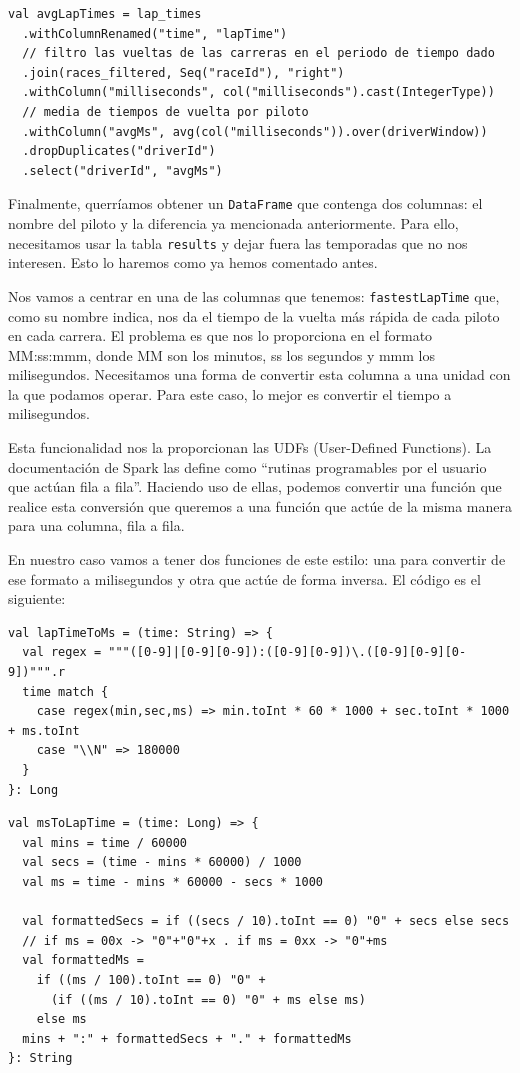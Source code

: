 \documentclass[12pt,twoside,titlepage]{report}
\newcommand{\quotes}[1]{``#1''}
\begin{document}
\begin{lstlisting}
val avgLapTimes = lap_times
  .withColumnRenamed("time", "lapTime")
  // filtro las vueltas de las carreras en el periodo de tiempo dado
  .join(races_filtered, Seq("raceId"), "right")
  .withColumn("milliseconds", col("milliseconds").cast(IntegerType))
  // media de tiempos de vuelta por piloto
  .withColumn("avgMs", avg(col("milliseconds")).over(driverWindow))
  .dropDuplicates("driverId")
  .select("driverId", "avgMs")
\end{lstlisting}


Finalmente, querríamos obtener un \texttt{DataFrame} que contenga dos columnas: el nombre del piloto y la diferencia ya mencionada anteriormente. Para ello, necesitamos usar la tabla \texttt{results} y dejar fuera las temporadas que no nos interesen. Esto lo haremos como ya hemos comentado antes.

Nos vamos a centrar en una de las columnas que tenemos: \texttt{fastestLapTime} que, como su nombre indica, nos da el tiempo de la vuelta más rápida de cada piloto en cada carrera. El problema es que nos lo proporciona en el formato MM:ss:mmm, donde MM son los minutos, ss los segundos y mmm los milisegundos. Necesitamos una forma de convertir esta columna a una unidad con la que podamos operar. Para este caso, lo mejor es convertir el tiempo a milisegundos.

Esta funcionalidad nos la proporcionan las UDFs (User-Defined Functions). La documentación de Spark las define como \quotes{rutinas programables por el usuario que actúan fila a fila}. Haciendo uso de ellas, podemos convertir una función que realice esta conversión que queremos a una función que actúe de la misma manera para una columna, fila a fila.

En nuestro caso vamos a tener dos funciones de este estilo: una para convertir de ese formato a milisegundos y otra que actúe de forma inversa. El código es el siguiente:


\begin{lstlisting}
val lapTimeToMs = (time: String) => {
  val regex = """([0-9]|[0-9][0-9]):([0-9][0-9])\.([0-9][0-9][0-9])""".r
  time match {
    case regex(min,sec,ms) => min.toInt * 60 * 1000 + sec.toInt * 1000 + ms.toInt
    case "\\N" => 180000
  }
}: Long
\end{lstlisting}

\begin{lstlisting}
val msToLapTime = (time: Long) => {
  val mins = time / 60000
  val secs = (time - mins * 60000) / 1000
  val ms = time - mins * 60000 - secs * 1000

  val formattedSecs = if ((secs / 10).toInt == 0) "0" + secs else secs
  // if ms = 00x -> "0"+"0"+x . if ms = 0xx -> "0"+ms
  val formattedMs =
    if ((ms / 100).toInt == 0) "0" +
      (if ((ms / 10).toInt == 0) "0" + ms else ms)
    else ms
  mins + ":" + formattedSecs + "." + formattedMs
}: String
\end{lstlisting}
\end{document}
